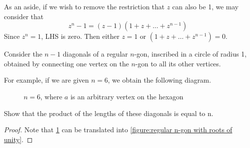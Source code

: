 \documentclass[11pt, oneside]{book}
\begin{document}
As an aside, if we wish to remove the restriction that $z$ can also be 1, we may consider that
\begin{equation*}
	z^n - 1 = (z - 1)(1 + z + \hdots + z^{n - 1})
\end{equation*}
Since $z^n = 1$, LHS is zero. Then either $z = 1$ or $(1 + z + \hdots + z^{n - 1}) = 0$.

\begin{ex}
	Consider the $n - 1$ diagonals of a regular $n$-gon, inscribed in a circle of radius 1, obtained by connecting one vertex on the $n$-gon to all its other vertices.

	For example, if we are given $n = 6$, we obtain the following diagram.

	\begin{figure}[H]
		\begin{center}
		\end{center}
		\caption[loftitle]{$n = 6$, where $a$ is an arbitrary vertex on the hexagon}
		\label{figure:regular hexagon with one point connected to all other vertices}
	\end{figure}

	Show that the product of the lengths of these diagonals is equal to n.

	\begin{proof}
		Note that \cref{figure:regular hexagon with one point connected to all other vertices} can be translated into \cref{figure:regular n-gon with roots of unity}.


\end{proof}
\end{ex}
\end{document}
